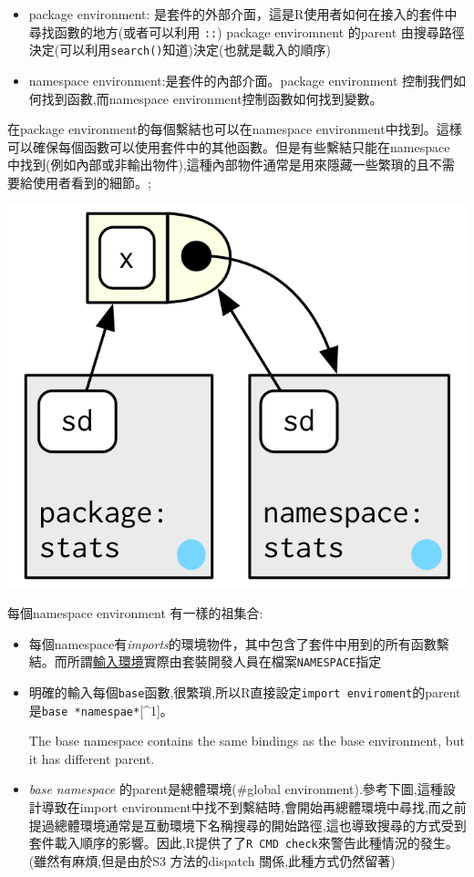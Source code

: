 \documentclass[]{book}
\theoremstyle{definition}
\theoremstyle{definition}
\theoremstyle{definition}
\theoremstyle{remark}
\begin{document}
\begin{itemize}
\item
  package environment:
  是套件的外部介面，這是R使用者如何在接入的套件中尋找函數的地方(或者可以利用
  \texttt{::}) package enviromnent 的parent
  由搜尋路徑決定(可以利用\texttt{search()}知道)決定(也就是載入的順序)
\item
  namespace environment:是套件的內部介面。package environment
  控制我們如何找到函數,而namespace environment控制函數如何找到變數。
\end{itemize}

在package environment的每個繫結也可以在namespace
environment中找到。這樣可以確保每個函數可以使用套件中的其他函數。但是有些繫結只能在namespace
中找到(例如內部或非輸出物件),這種內部物件通常是用來隱藏一些繁瑣的且不需要給使用者看到的細節。;

\begin{center}\includegraphics{diagrams/environments/namespace-bind} \end{center}

每個namespace environment 有一樣的祖集合:

\begin{itemize}
\item
  每個namespace有\emph{imports}的環境物件，其中包含了套件中用到的所有函數繫結。而所謂\protect\hyperlink{imports-environment}{輸入環境}實際由套裝開發人員在檔案\texttt{NAMESPACE}指定
\item
  明確的輸入每個\texttt{base}函數,很繁瑣,所以R直接設定\texttt{import\ enviroment}的parent是\texttt{base\ *namespae*}{[}\^{}1{]}。

  The base namespace contains the same bindings as the base environment,
  but it has different parent.
\item
  \emph{base namespace} 的parent是總體環境(\#global
  environment).參考下圖,這種設計導致在import
  environment中找不到繫結時,會開始再總體環境中尋找,而之前提過總體環境通常是互動環境下名稱搜尋的開始路徑,這也導致搜尋的方式受到套件載入順序的影響。因此,R提供了了\texttt{R\ CMD\ check}來警告此種情況的發生。(雖然有麻煩,但是由於S3
  方法的dispatch 關係,此種方式仍然留著)
\end{itemize}
\end{document}
